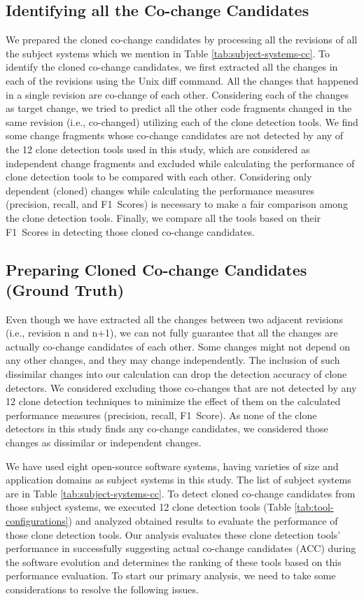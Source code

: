 \documentclass[review]{elsarticle}
\begin{document}
\subsection{Identifying all the Co-change Candidates}
We prepared the cloned co-change candidates by processing all the revisions of all the subject systems which we mention in Table \ref{tab:subject-systems-cc}. To identify the cloned co-change candidates, we first extracted all the changes in each of the revisions using the Unix diff command. All the changes that happened in a single revision are co-change of each other. Considering each of the changes as target change, we tried to predict all the other code fragments changed in the same revision (i.e., co-changed) utilizing each of the clone detection tools. We find some change fragments whose co-change candidates are not detected by any of the 12 clone detection tools used in this study, which are considered as independent change fragments and excluded while calculating the performance of clone detection tools to be compared with each other. Considering only dependent (cloned) changes while calculating the performance measures (precision, recall, and F1~Scores) is necessary to make a fair comparison among the clone detection tools. Finally, we compare all the tools based on their F1~Scores in detecting those cloned co-change candidates.

\subsection{Preparing Cloned Co-change Candidates (Ground Truth)} 
Even though we have extracted all the changes between two adjacent revisions (i.e., revision n and n+1), we can not fully guarantee that all the changes are actually co-change candidates of each other. Some changes might not depend on any other changes, and they may change independently. The inclusion of such dissimilar changes into our calculation can drop the detection accuracy of clone detectors. We considered excluding those co-changes that are not detected by any 12 clone detection techniques to minimize the effect of them on the calculated performance measures (precision, recall, F1~Score). As none of the clone detectors in this study finds any co-change candidates, we considered those changes as dissimilar or independent changes. 


We have used eight open-source software systems, having varieties of size and application domains as subject systems in this study. The list of subject systems are in Table \ref{tab:subject-systems-cc}. To detect cloned co-change candidates from those subject systems, we executed 12 clone detection tools (Table \ref{tab:tool-configurations}) and analyzed obtained results to evaluate the performance of those clone detection tools. Our analysis evaluates these clone detection tools' performance in successfully suggesting actual co-change candidates (ACC) during the software evolution and determines the ranking of these tools based on this performance evaluation. To start our primary analysis, we need to take some considerations to resolve the following issues. 
\end{document}
